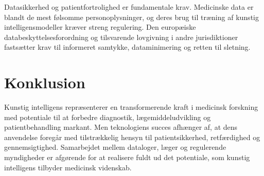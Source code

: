 \documentclass[
    language=danish,
    doctype=article,
]{../../omnilatex}
\begin{document}
Datasikkerhed og patientfortrolighed er fundamentale krav. Medicinske data er blandt de mest følsomme personoplysninger, og deres brug til træning af kunstig intelligensmodeller kræver streng regulering. Den europæiske databeskyttelsesforordning og tilsvarende lovgivning i andre jurisdiktioner fastsætter krav til informeret samtykke, dataminimering og retten til sletning.

\section{Konklusion}
Kunstig intelligens repræsenterer en transformerende kraft i medicinsk forskning med potentiale til at forbedre diagnostik, lægemiddeludvikling og patientbehandling markant. Men teknologiens succes afhænger af, at dens anvendelse foregår med tilstrækkelig hensyn til patientsikkerhed, retfærdighed og gennemsigtighed. Samarbejdet mellem dataloger, læger og regulerende myndigheder er afgørende for at realisere fuldt ud det potentiale, som kunstig intelligens tilbyder medicinsk videnskab.
\end{document}
